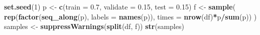 \documentclass[]{book}
\newenvironment{Shaded}{\begin{snugshade}}{\end{snugshade}}
\newcommand{\KeywordTok}[1]{\textcolor[rgb]{0.13,0.29,0.53}{\textbf{#1}}}
\newcommand{\DataTypeTok}[1]{\textcolor[rgb]{0.13,0.29,0.53}{#1}}
\newcommand{\DecValTok}[1]{\textcolor[rgb]{0.00,0.00,0.81}{#1}}
\newcommand{\FloatTok}[1]{\textcolor[rgb]{0.00,0.00,0.81}{#1}}
\newcommand{\StringTok}[1]{\textcolor[rgb]{0.31,0.60,0.02}{#1}}
\newcommand{\OperatorTok}[1]{\textcolor[rgb]{0.81,0.36,0.00}{\textbf{#1}}}
\newcommand{\NormalTok}[1]{#1}
\theoremstyle{break}
\theoremstyle{definition}
\theoremstyle{definition}
\theoremstyle{definition}
\theoremstyle{remark}
\begin{document}
\begin{Shaded}
\begin{Highlighting}[]
\KeywordTok{set.seed}\NormalTok{(}\DecValTok{1}\NormalTok{)}
\NormalTok{p <-}\StringTok{ }\KeywordTok{c}\NormalTok{(}\DataTypeTok{train =} \FloatTok{0.7}\NormalTok{, }\DataTypeTok{validate =} \FloatTok{0.15}\NormalTok{, }\DataTypeTok{test =} \FloatTok{0.15}\NormalTok{)}
\NormalTok{f <-}\StringTok{ }\KeywordTok{sample}\NormalTok{( }\KeywordTok{rep}\NormalTok{(}\KeywordTok{factor}\NormalTok{(}\KeywordTok{seq_along}\NormalTok{(p), }\DataTypeTok{labels =} \KeywordTok{names}\NormalTok{(p)),}
                 \DataTypeTok{times =} \KeywordTok{nrow}\NormalTok{(df)}\OperatorTok{*}\NormalTok{p}\OperatorTok{/}\KeywordTok{sum}\NormalTok{(p)) )}
\NormalTok{samples <-}\StringTok{ }\KeywordTok{suppressWarnings}\NormalTok{(}\KeywordTok{split}\NormalTok{(df, f))}
\KeywordTok{str}\NormalTok{(samples)}
\end{Highlighting}
\end{Shaded}
\end{document}
